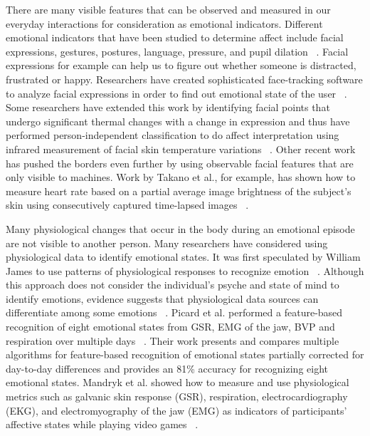 There are many visible features that can be observed and measured in our everyday interactions for consideration as emotional indicators. Different emotional indicators that have been studied to determine affect include facial expressions, gestures, postures, language, pressure, and pupil dilation ~\cite{picard2003affective}. Facial expressions for example can help us to figure out whether someone is distracted, frustrated or happy. Researchers have created sophisticated face-tracking software to analyze facial expressions in order to find out emotional state of the user ~\cite{partala2006real, sebe2006emotion}. Some researchers have extended this work by identifying facial points that undergo significant thermal changes with a change in expression and thus have performed person-independent classification to do affect interpretation using infrared measurement of facial skin temperature variations ~\cite{khan2006automated}. Other recent work has pushed the borders even further by using observable facial features that are only visible to machines. Work by Takano et al., for example, has shown how to measure heart rate based on a partial average image brightness of the subject's skin using consecutively captured time-lapsed images ~\cite{takano2007heart}.

Many physiological changes that occur in the body during an emotional episode are not visible to another person. Many researchers have considered using physiological data to identify emotional states. It was first speculated by William James to use patterns of physiological responses to recognize emotion ~\cite{cacioppo2000psychophysiology}. Although this approach does not consider the individual's psyche and state of mind to identify emotions, evidence suggests that physiological data sources can differentiate among some emotions ~\cite{ekman1983autonomic}. Picard et al. performed a feature-based recognition of eight emotional states from GSR, EMG of the jaw, BVP and respiration over multiple days ~\cite{picard2001toward}. Their work presents and compares multiple algorithms for feature-based recognition of emotional states partially corrected for day-to-day differences and provides an 81\% accuracy for recognizing eight emotional states. Mandryk et al. showed how to measure and use physiological metrics such as galvanic skin response (GSR), respiration, electrocardiography (EKG), and electromyography of the jaw (EMG) as indicators of participants' affective states while playing video games ~\cite{mandryk2007fuzzy}.

